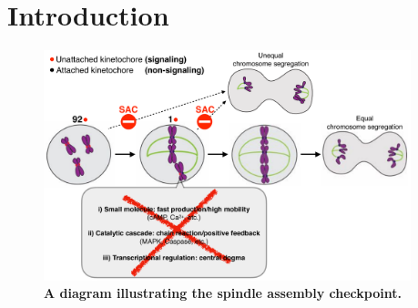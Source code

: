 \chapter{Introduction}
\label{chpt:introduction}

\begin{figure}
    \centering
    \includegraphics[width=0.95\textwidth]{chapters/figures/Introduction.pdf}
    \caption{\textbf{A diagram illustrating the spindle assembly checkpoint.}}
    \label{Introduction}
\end{figure}